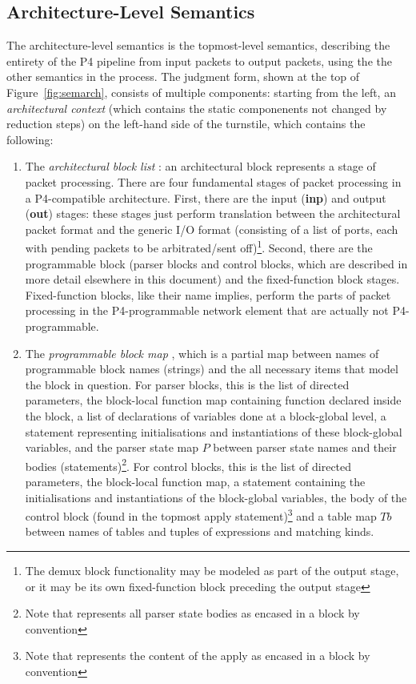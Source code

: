 \documentclass[UTF8]{article}
\begin{document}
\subsection{Architecture-Level Semantics}
The architecture-level semantics is the topmost-level semantics, describing the entirety of the P4 pipeline from input packets to output packets, using the the other semantics in the process. The judgment form, shown at the top of Figure~\ref{fig:semarch}, consists of multiple components: starting from the left, an \emph{architectural context} \actx{} (which contains the static componenents not changed by reduction steps) on the left-hand side of the turnstile, which contains the following:
\begin{enumerate}
\item The \emph{architectural block list} \abl{}: an architectural block represents a stage of packet processing. There are four fundamental stages of packet processing in a P4-compatible architecture. First, there are the input (\textbf{inp}) and output (\textbf{out}) stages: these stages just perform translation between the architectural packet format and the generic I/O format (consisting of a list of ports, each with pending packets to be arbitrated/sent off)\footnote{The demux block functionality may be modeled as part of the output stage, or it may be its own fixed-function block preceding the output stage}. Second, there are the programmable block (parser blocks and control blocks, which are described in more detail elsewhere in this document) and the fixed-function block stages. Fixed-function blocks, like their name implies, perform the parts of packet processing in the P4-programmable network element that are actually not P4-programmable.
\item The \emph{programmable block map} \pbm{}, which is a partial map between names of programmable block names (strings) and the all necessary items that model the block in question. For parser blocks, this is the list of directed parameters, the block-local function map containing function declared inside the block, a list of declarations of variables done at a block-global level, a statement representing initialisations and instantiations of these block-global variables, and the parser state map $P$ between parser state names and their bodies (statements)\footnote{Note that \pfott{} represents all parser state bodies as encased in a block by convention}. For control blocks, this is the list of directed parameters, the block-local function map, a statement containing the initialisations and instantiations of the block-global variables, the body of the control block (found in the topmost apply statement)\footnote{Note that \pfott{} represents the content of the apply as encased in a block by convention} and a table map $\mathit{Tb}$ between names of tables and tuples of expressions and matching kinds.

\end{enumerate}
\end{document}
